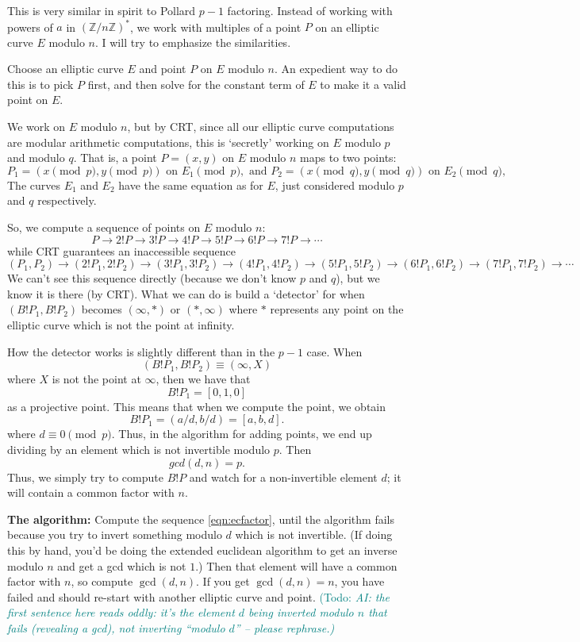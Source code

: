 \documentclass{article}
\theoremstyle{plain}
\theoremstyle{definition}
\theoremstyle{remark}
\numberwithin{theorem}{section}
\newcommand{\todo}[1]{\textcolor{teal}{{\sf (Todo:} {\sl{#1})}}}
\newcommand{\todo}[1]{}
\newcommand{\ZZ}{\mathbb{Z}}
\begin{document}
This is very similar in spirit to Pollard $p-1$ factoring.  Instead of working with powers of $a$ in $(\ZZ/n\ZZ)^*$, we work with multiples of a point $P$ on an elliptic curve $E$ modulo $n$.  I will try to emphasize the similarities.

Choose an elliptic curve $E$ and point $P$ on $E$ modulo $n$.  An expedient way to do this is to pick $P$ first, and then solve for the constant term of $E$ to make it a valid point on $E$.

We work on $E$ modulo $n$, but by CRT, since all our elliptic curve computations are modular arithmetic computations, this is `secretly' working on $E$ modulo $p$ and modulo $q$.  That is, a point $P =(x,y)$ on $E$ modulo $n$ maps to two points:
\[
P_1 = (x \pmod{p}, y \pmod{p}) \text{ on } E_1 \pmod{p}, \text{ and }
P_2 = (x \pmod{q}, y \pmod{q}) \text{ on } E_2 \pmod{q}, 
\]
The curves $E_1$ and $E_2$ have the same equation as for $E$, just considered modulo $p$ and $q$ respectively.

So, we compute a sequence of points on $E$ modulo $n$:
\begin{equation}
    \label{eqn:ecfactor}
P \rightarrow 2!P
\rightarrow 3!P
\rightarrow 4!P
\rightarrow 5!P
\rightarrow 6!P
\rightarrow 7!P
\rightarrow \cdots
\end{equation}
while CRT guarantees an inaccessible sequence
\[
(P_1,P_2) \rightarrow (2!P_1,2!P_2)
\rightarrow (3!P_1, 3!P_2)
\rightarrow (4!P_1, 4!P_2)
\rightarrow (5!P_1, 5!P_2)
\rightarrow (6!P_1, 6!P_2)
\rightarrow (7!P_1, 7!P_2)
\rightarrow \cdots
\]
We can't see this sequence directly (because we don't know $p$ and $q$), but we know it is there (by CRT).  What we can do is build a `detector' for when $(B!P_1, B!P_2)$ becomes $(\infty, *)$ or $(*, \infty)$ where $*$ represents any point on the elliptic curve which is not the point at infinity.

How the detector works is slightly different than in the $p-1$ case.  When
\[
(B!P_1, B!P_2) \equiv (\infty ,X)
\]
where $X$ is not the point at $\infty$, then we have that
\[
B!P_1 = [0,1,0]
\]
as a projective point.  This means that when we compute the point, we obtain
\[
B!P_1 = (a/d,b/d) = [a,b,d].
\]
where $d \equiv 0 \pmod p$.  Thus, in the algorithm for adding points, we end up dividing by an element which is not invertible modulo $p$.  Then
\[
gcd(d,n) = p.
\]
Thus, we simply try to compute $B!P$ and watch for a non-invertible element $d$; it will contain a common factor with $n$.

\textbf{The algorithm:}  Compute the sequence \eqref{eqn:ecfactor}, until the algorithm fails because you try to invert something modulo $d$ which is not invertible.  (If doing this by hand, you'd be doing the extended euclidean algorithm to get an inverse modulo $n$ and get a gcd which is not $1$.)  Then that element will have a common factor with $n$, so compute $\gcd(d,n)$.  If you get $\gcd(d,n) = n$, you have failed and should re-start with another elliptic curve and point.  \todo{AI: the first sentence here reads oddly: it's the element $d$ being inverted \emph{modulo $n$} that fails (revealing a gcd), not inverting ``modulo $d$'' -- please rephrase.}
\end{document}
